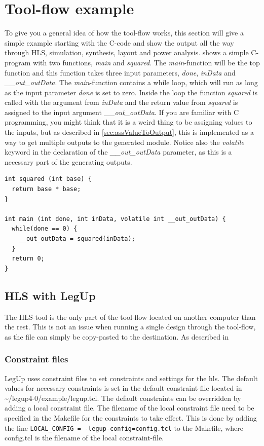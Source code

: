 \chapter{\label{chp:toolflowex}Tool-flow example}
To give you a general idea of how the tool-flow works, this section will give a simple example starting with the C-code and show the output all the way through HLS, simulation, synthesis, layout and power analysis.  shows a simple C-program with two functions, \textit{main} and \textit{squared}. The \textit{main}-function will be the top function and this function takes three input parameters, \textit{done}, \textit{inData} and \textit{\_\_out\_outData}. The \textit{main}-function contains a while loop, which will run as long as the input parameter \textit{done} is set to zero. Inside the loop the function \textit{squared} is called with the argument from \textit{inData} and the return value from \textit{squared} is assigned to the input argument \textit{\_\_out\_outData}. If you are familiar with C programming, you might think that it is a weird thing to be assigning values to the inputs, but as described in \cref{sec:assValueToOutput}, this is implemented as a way to get multiple outputs to the generated module. Notice also the \textit{volatile} keyword in the declaration of the \textit{\_\_out\_outData} parameter, as this is a necessary part of the generating outputs.
\lstset{language=C++,style=Cstyle}
\begin{lstlisting}[caption={Simple C-code example},label=lst:ccodelisting]
int squared (int base) {
  return base * base;
}

int main (int done, int inData, volatile int __out_outData) {
  while(done == 0) {
    __out_outData = squared(inData);
  }
  return 0;
}
\end{lstlisting}

\section{HLS with LegUp}
The HLS-tool is the only part of the tool-flow located on another computer than the rest. This is not an issue when running a single design through the tool-flow, as the file can simply be copy-pasted to the destination. As described in \
\subsection{Constraint files}
LegUp uses constraint files to set constraints and settings for the \gls{hls}. The default values for necessary constraints is set in the default constraint-file located in \textasciitilde/legup4-0/example/legup.tcl. The default constraints can be overridden by adding a local constraint file. The filename of the local constraint file need to be specified in the Makefile for the constraints to take effect. This is done by adding the line \verb!LOCAL_CONFIG = -legup-config=config.tcl! to the Makefile, where config.tcl is the filename of the local constraint-file. 
